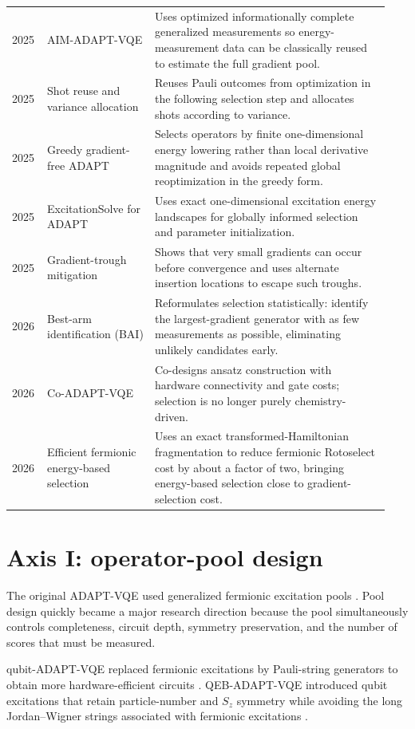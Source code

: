 \documentclass[11pt]{article}
\begin{document}
\begin{longtable}{p{0.08\linewidth}p{0.27\linewidth}p{0.59\linewidth}}
2025 & AIM-ADAPT-VQE \cite{Nykanen2025} & Uses optimized informationally complete generalized measurements so energy-measurement data can be classically reused to estimate the full gradient pool. \\
2025 & Shot reuse and variance allocation \cite{Ikhtiarudin2025} & Reuses Pauli outcomes from optimization in the following selection step and allocates shots according to variance. \\
2025 & Greedy gradient-free ADAPT \cite{Feniou2025} & Selects operators by finite one-dimensional energy lowering rather than local derivative magnitude and avoids repeated global reoptimization in the greedy form. \\
2025 & ExcitationSolve for ADAPT \cite{Jager2025} & Uses exact one-dimensional excitation energy landscapes for globally informed selection and parameter initialization. \\
2025 & Gradient-trough mitigation \cite{Stadelmann2025} & Shows that very small gradients can occur before convergence and uses alternate insertion locations to escape such troughs. \\
2026 & Best-arm identification (BAI) \cite{Huang2026} & Reformulates selection statistically: identify the largest-gradient generator with as few measurements as possible, eliminating unlikely candidates early. \\
2026 & Co-ADAPT-VQE \cite{Ramoa2026CoDesign} & Co-designs ansatz construction with hardware connectivity and gate costs; selection is no longer purely chemistry-driven. \\
2026 & Efficient fermionic energy-based selection \cite{Rossi2026} & Uses an exact transformed-Hamiltonian fragmentation to reduce fermionic Rotoselect cost by about a factor of two, bringing energy-based selection close to gradient-selection cost. \\
\bottomrule
\end{longtable}

\section{Axis I: operator-pool design}

The original ADAPT-VQE used generalized fermionic excitation pools \cite{Grimsley2019}. Pool design quickly became a major research direction because the pool simultaneously controls completeness, circuit depth, symmetry preservation, and the number of scores that must be measured.

qubit-ADAPT-VQE replaced fermionic excitations by Pauli-string generators to obtain more hardware-efficient circuits \cite{Tang2021}. QEB-ADAPT-VQE introduced qubit excitations that retain particle-number and $S_z$ symmetry while avoiding the long Jordan--Wigner strings associated with fermionic excitations \cite{Yordanov2021}.
\end{document}
